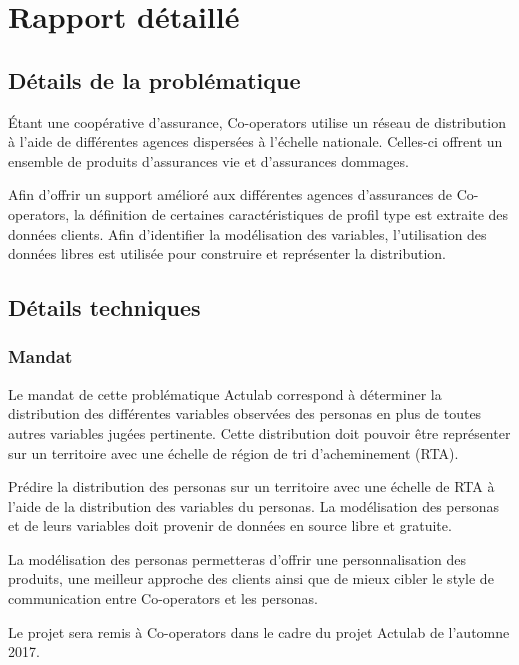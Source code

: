 \documentclass[11pt,french]{report}\usepackage[]{graphicx}\usepackage[]{color}
\begin{document}
\chapter*{Rapport détaillé}

\section*{Détails de la problématique}
Étant une coopérative d'assurance, Co-operators utilise un réseau de distribution à l'aide de différentes agences dispersées à l'échelle nationale. Celles-ci offrent un ensemble  de produits d'assurances vie et d'assurances dommages.
\newline

Afin d'offrir un support amélioré aux différentes agences d'assurances de Co-operators, la définition de certaines caractéristiques de profil type est extraite des données clients.  Afin d'identifier la modélisation des variables, l'utilisation des données libres est utilisée pour construire et représenter la distribution. 

\section*{Détails techniques}
\subsection*{Mandat}

Le mandat de cette problématique Actulab correspond à déterminer la distribution des différentes variables observées des personas en plus de toutes autres variables jugées pertinente. Cette distribution doit pouvoir être représenter sur un territoire avec une échelle de région de tri d'acheminement (RTA).
\newline

Prédire la distribution des personas sur un territoire avec une échelle de RTA à l'aide de la distribution des variables du personas. La modélisation des personas et de leurs variables doit provenir de données en source libre et gratuite. 
\newline

La modélisation des personas permetteras d'offrir une personnalisation des produits, une meilleur approche des clients ainsi que de mieux cibler le style de communication entre Co-operators et les personas.
\newline

Le projet sera remis à Co-operators dans le cadre du projet Actulab de l'automne 2017.
\end{document}
